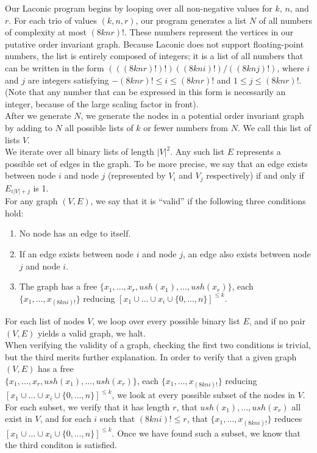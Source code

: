 \documentclass[11pt]{article}
\begin{document}
Our Laconic program begins by looping over all non-negative values for $k$, $n$, and $r$. For each trio of values $(k, n, r)$, our program generates a list $N$ of all numbers of complexity at most $(8knr)!$. These numbers represent the vertices in our putative order invariant graph. Because Laconic does not support floating-point numbers, the list is entirely composed of integers; it is a list of all numbers that can be written in the form $(((8knr)!)!)((8kni)!)/((8knj)!)$, where $i$ and $j$ are integers satisfying $-(8knr)! \le i \le (8knr)!$ and $1 \le j \le (8knr)!$. (Note that any number that can be expressed in this form is necessarily an integer, because of the large scaling factor in front). \\

After we generate $N$, we generate the nodes in a potential order invariant graph by adding to $N$ all possible lists of $k$ or fewer numbers from $N$. We call this list of lists $V$. \\

We iterate over all binary lists of length $|V|^2$. Any such list $E$ represents a possible set of edges in the graph. To be more precise, we say that an edge exists between node $i$ and node $j$ (represented by $V_i$ and $V_j$ respectively) if and only if $E_{i|V| + j}$ is 1. \\

For any graph $(V, E)$, we say that it is ``valid'' if the following three conditions hold:

\begin{enumerate}

\item No node has an edge to itself.
\item If an edge exists between node $i$ and node $j$, an edge also exists between node $j$ and node $i$.
\item The graph has a free $\{x_1,\dots,x_r, ush(x_1),...,ush(x_r)\}$, each  $\{x_1, \dots, x_{(8kni)!}\}$ reducing $[x_1 \cup \dots \cup x_i \cup \{0,\dots,n\}]^{\le k}$.

\end{enumerate}

For each list of nodes $V$, we loop over every possible binary list $E$, and if no pair $(V, E)$ yields a valid graph, we halt. \\

When verifying the validity of a graph, checking the first two conditions is trivial, but the third merits further explanation. In order to verify that a given graph $(V, E)$ has a free \\ $\{x_1,\dots,x_r, ush(x_1),...,ush(x_r)\}$, each  $\{x_1, \dots, x_{(8kni)!}\}$ reducing $[x_1 \cup \dots \cup x_i \cup \{0,\dots,n\}]^{\le k}$, we look at every possible subset of the nodes in $V$. For each subset, we verify that it has length $r$, that $ush(x_1),...,ush(x_r)$ all exist in $V$, and for each $i$ such that $(8kni)! \le r$, that $\{x_1, \dots, x_{(8kni)!}\}$ reduces $[x_1 \cup \dots \cup x_i \cup \{0,\dots,n\}]^{\le k}$. Once we have found such a subset, we know that the third conditon is satisfied.
\end{document}
